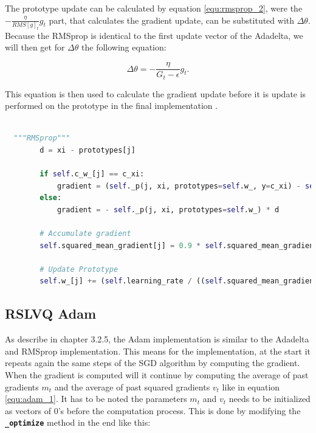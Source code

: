 \documentclass[12pt,oneside,a4paper,parskip]{scrbook}
\begin{document}
The prototype update can be calculated by equation \ref{equ:rmsprop_2}, were the $-\frac{\eta}{RMS[\textit{g}]_t} g_t$ 
part, that calculates the gradient update, can be substituted with $\Delta\theta$.
Because the RMSprop is identical to the first update vector of the Adadelta, we will then get for $\Delta\theta$ the following 
equation:

\begin{equation}
  \Delta\theta = - \frac{\eta}{G_t-\epsilon} \textit{g}_\textit{t}.
\end{equation}

This equation is then used to calculate the gradient update before it is update is performed on the prototype in the 
final implementation \cite{PassiveDriftonRSLVQ}.

\pagebreak

\begin{lstlisting}[label=lst:rmsprop,
  language=python,
  firstnumber=1,
  caption= Implementation of the RMSprop from \cite{PassiveDriftonRSLVQ}.]			   

  """RMSprop"""
        d = xi - prototypes[j]
                
        if self.c_w_[j] == c_xi:
            gradient = (self._p(j, xi, prototypes=self.w_, y=c_xi) - self._p(j, xi, prototypes=self.w_)) * d
        else:
            gradient = - self._p(j, xi, prototypes=self.w_) * d
            
        # Accumulate gradient
        self.squared_mean_gradient[j] = 0.9 * self.squared_mean_gradient[j] + 0.1 * gradient ** 2
        
        # Update Prototype
        self.w_[j] += (self.learning_rate / ((self.squared_mean_gradient[j] + self.epsilon) ** 0.5)) * gradient
\end{lstlisting}

\subsection{RSLVQ Adam}

As describe in chapter 3.2.5, the Adam implementation is similar to the Adadelta and RMSprop implementation.
This means for the implementation, at the start it repeats again the same steps of the SGD algorithm by computing the gradient.
When the gradient is computed will it continue by computing the average of past  gradients $m_t$ and the average  of  past  squared  gradients $v_t$
like in equation \ref{equ:adam_1}. It has to be noted the parameters $m_t$ and $v_t$ needs to be initialized as vectors of 0's before
the computation process. This is done by modifying the \textbf{\texttt{\_optimize}} method in the end like this:
\end{document}
